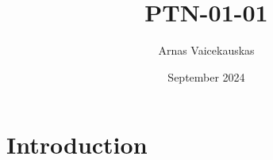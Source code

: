 \documentclass{article}
\title{PTN-01-01}
\author{Arnas Vaicekauskas}
\date{September 2024}
\begin{document}
\maketitle

\section{Introduction}
\end{document}
